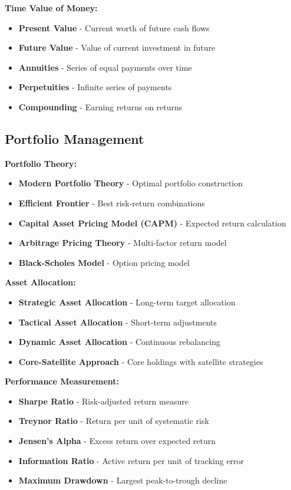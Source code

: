 \documentclass[12pt]{article}
\begin{document}
\textbf{Time Value of Money:}
\begin{itemize}
    \item \textbf{Present Value} - Current worth of future cash flows
    \item \textbf{Future Value} - Value of current investment in future
    \item \textbf{Annuities} - Series of equal payments over time
    \item \textbf{Perpetuities} - Infinite series of payments
    \item \textbf{Compounding} - Earning returns on returns
\end{itemize}

\subsection{Portfolio Management}

\textbf{Portfolio Theory:}
\begin{itemize}
    \item \textbf{Modern Portfolio Theory} - Optimal portfolio construction
    \item \textbf{Efficient Frontier} - Best risk-return combinations
    \item \textbf{Capital Asset Pricing Model (CAPM)} - Expected return calculation
    \item \textbf{Arbitrage Pricing Theory} - Multi-factor return model
    \item \textbf{Black-Scholes Model} - Option pricing model
\end{itemize}

\textbf{Asset Allocation:}
\begin{itemize}
    \item \textbf{Strategic Asset Allocation} - Long-term target allocation
    \item \textbf{Tactical Asset Allocation} - Short-term adjustments
    \item \textbf{Dynamic Asset Allocation} - Continuous rebalancing
    \item \textbf{Core-Satellite Approach} - Core holdings with satellite strategies
\end{itemize}

\textbf{Performance Measurement:}
\begin{itemize}
    \item \textbf{Sharpe Ratio} - Risk-adjusted return measure
    \item \textbf{Treynor Ratio} - Return per unit of systematic risk
    \item \textbf{Jensen's Alpha} - Excess return over expected return
    \item \textbf{Information Ratio} - Active return per unit of tracking error
    \item \textbf{Maximum Drawdown} - Largest peak-to-trough decline
\end{itemize}
\end{document}
